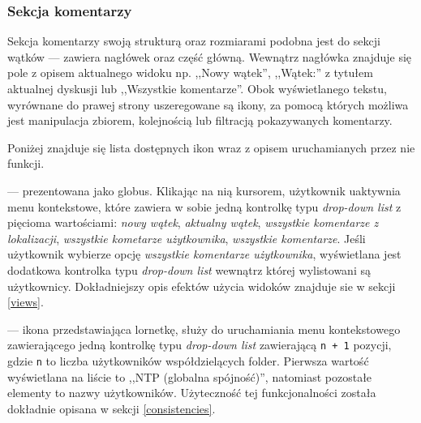\subsubsection*{Sekcja komentarzy}

Sekcja komentarzy swoją strukturą oraz rozmiarami podobna jest do sekcji wątków --- zawiera nagłówek oraz część główną. Wewnątrz nagłówka znajduje się pole z opisem aktualnego widoku np. ,,Nowy wątek'', ,,Wątek:'' z tytułem aktualnej dyskusji lub ,,Wszystkie komentarze''. Obok wyświetlanego tekstu, wyrównane do prawej strony uszeregowane są ikony, za pomocą których możliwa jest manipulacja zbiorem, kolejnością lub filtracją pokazywanych komentarzy.

Poniżej znajduje się lista dostępnych ikon wraz z opisem uruchamianych przez nie funkcji.

\begin{description}[noitemsep]
  \item[Ikona zmiany widoków] --- prezentowana jako globus. Klikając na nią kursorem, użytkownik uaktywnia menu kontekstowe, które zawiera w sobie jedną kontrolkę typu \emph{drop-down list} z pięcioma wartościami: \emph{nowy wątek}, \emph{aktualny wątek}, \emph{wszystkie komentarze z lokalizacji}, \emph{wszystkie kometarze użytkownika}, \emph{wszystkie komentarze}. Jeśli użytkownik wybierze opcję \emph{wszystkie komentarze użytkownika}, wyświetlana jest dodatkowa kontrolka typu \emph{drop-down list} wewnątrz której wylistowani są użytkownicy. Dokładniejszy opis efektów użycia widoków znajduje sie w sekcji \ref{views}.
  
  \item[Ikona zmiany spójności] --- ikona przedstawiająca lornetkę, służy do uruchamiania menu kontekstowego zawierającego jedną kontrolkę typu \emph{drop-down list} zawierającą \texttt{n + 1} pozycji, gdzie \texttt{n} to liczba użytkowników współdzielących folder. Pierwsza wartość wyświetlana na liście to ,,NTP (globalna spójność)'', natomiast pozostałe elementy to nazwy użytkowników. Użyteczność tej funkcjonalności została dokładnie opisana w sekcji \ref{consistencies}.
  

\end{description}
